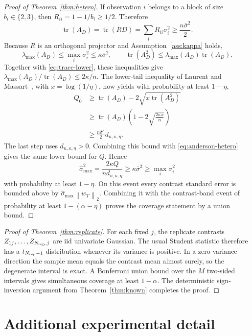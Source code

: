 \documentclass{interact}
\theoremstyle{definition}
\theoremstyle{remark}
\newcommand{\norm}[1]{\left\lVert #1\right\rVert_2}
\begin{document}
\begin{proof}[Proof of Theorem~\ref{thm:hetero}]
If observation $i$ belongs to a block of size $b_i\in\{2,3\}$, then
$R_{ii}=1-1/b_i\geq1/2$.  Therefore
\begin{equation}
 \operatorname{tr}(A_D)=\operatorname{tr}(RD)
 =\sum_iR_{ii}\sigma_i^2\geq\frac{n\bar\sigma^2}{2}.
\label{eq:trace-lower}
\end{equation}
Because $R$ is an orthogonal projector and Assumption~\ref{ass:kappa} holds,
\[
 \lambda_{\max}(A_D)\leq\max_i\sigma_i^2
 \leq\kappa\bar\sigma^2,
 \qquad
 \operatorname{tr}(A_D^2)
 \leq\lambda_{\max}(A_D)\operatorname{tr}(A_D).
\]
Together with \eqref{eq:trace-lower}, these inequalities give
$\lambda_{\max}(A_D)/\operatorname{tr}(A_D)\leq2\kappa/n$.
The lower-tail inequality of Laurent and Massart~\citep{laurent2000adaptive}, with
$x=\log(1/\eta)$, now yields with probability at least $1-\eta$,
\begin{align*}
 Q_0
 &\geq \operatorname{tr}(A_D)
      -2\sqrt{x\operatorname{tr}(A_D^2)}\\
 &\geq \operatorname{tr}(A_D)
      \left(1-2\sqrt{\frac{2\kappa x}{n}}\right)\\
 &\geq \frac{n\bar\sigma^2}{2}d_{n,\kappa,\eta}.
\end{align*}
The last step uses $d_{n,\kappa,\eta}>0$.  Combining this bound with
\eqref{eq:anderson-hetero} gives the same lower bound for $Q$.  Hence
\[
 \widehat\sigma_{\max}^2
 =\frac{2\kappa Q}{nd_{n,\kappa,\eta}}
 \geq\kappa\bar\sigma^2\geq\max_i\sigma_i^2
\]
with probability at least $1-\eta$.  On this event every contrast standard
error is bounded above by $\widehat\sigma_{\max}\norm{w_T}$.  Combining it with
the contrast-band event of probability at least $1-(\alpha-\eta)$ proves the
coverage statement by a union bound.
\end{proof}

\begin{proof}[Proof of Theorem~\ref{thm:replicate}]
For each fixed $j$, the replicate contrasts
$Z_{1j},\ldots,Z_{N_{\rm rep},j}$ are iid
univariate Gaussian.  The usual Student statistic therefore has a
$t_{N_{\rm rep}-1}$ distribution whenever its variance is positive.  In a zero-variance
direction the sample mean equals the contrast mean almost surely, so the
degenerate interval is exact.  A Bonferroni union bound over the $M$ two-sided
intervals gives simultaneous coverage at least $1-\alpha$.  The deterministic
sign-inversion argument from Theorem~\ref{thm:known} completes the proof.
\end{proof}

\section{Additional experimental detail}
\end{document}
